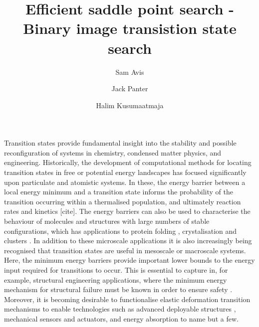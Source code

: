 \documentclass[aps,twocolumn]{revtex4}
\newcommand{\temp}[1]{{\leavevmode\color{red}#1}}
\begin{document}
\title{Efficient saddle point search - Binary image transistion state search}
\author{Sam Avis}
\author{Jack Panter}
\author{Halim Kusumaatmaja}

\begin{abstract}
\lipsum[1]
\end{abstract}

\maketitle


\topic Transition states provide fundamental insight into the stability and possible reconfiguration of systems in chemistry, condensed matter physics, and engineering.
Historically, the development of computational methods for locating transition states in free or potential energy landscapes has focused significantly upon particulate and atomistic systems.
In these, the energy barrier between a local energy minimum and a transition state informs the probability of the transition occurring within a thermalised population, and ultimately reaction rates and kinetics \temp{[cite]}.
The energy barriers can also be used to characterise the behaviour of molecules and structures with large numbers of stable configurations, which has applications to protein folding \cite{Bryngelson1995,Onuchic1997}, crystalisation and clusters \cite{Wales1998,Wales2012}.
In addition to these microscale applications it is also increasingly being recognised that transition states are useful in mesoscale or macroscale systems.
Here, the minimum energy barriers provide important lower bounds to the energy input required for transitions to occur.
This is essential to capture in, for example, structural engineering applications, where the minimum energy mechanism for structural failure must be known in order to ensure safety \cite{Panter2019,Hutchinson2018}.
Moreover, it is becoming desirable to functionalise elastic deformation transition mechanisms to enable technologies such as advanced deployable structures \cite{Filipov2015,Zhai2018}, mechanical sensors and actuators, and energy absorption \cite{Shan2015} to name but a few.
\end{document}
